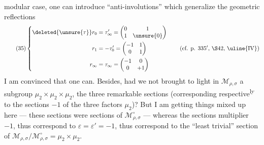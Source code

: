 modular case, one can introduce ``anti-involutions'' which generalize the geometric reflections
\[
\tag{35}
\left\{
\begin{aligned}
\deleted{\unsure{\tau}}r_0&=\tau'_\infty=\begin{pmatrix}0&1\\1&\unsure{0}\end{pmatrix}\\
r_1&=-\tau'_0=\begin{pmatrix}-1&1\\0&1\end{pmatrix}\\
r_\infty&=\tau_\infty=\begin{pmatrix}-1&0\\0&+1\end{pmatrix}
\end{aligned}
\right.
\qquad\text{(cf. p. $335'$, $\S42$, $\uline{\mathrm{IV}}$)}
\]
I am convinced that one can. Besides, had we not brought to light in $\mathcal M_{\rho,\sigma}$ a subgroup $\mu_2\times\mu_2\times\mu_2$,   the three remarkable sections (corresponding respective\textsuperscript{ly} to the  sections $-1$ of the three factors $\mu_2$)? But I am getting things mixed up here --- these sections were sections of $\mathcal M_{\rho,\sigma}^{\circ}$ --- whereas the sections    multiplier
$-1$, thus correspond to $\varepsilon=\varepsilon'=-1$, thus correspond to the ``least trivial'' section  of $\mathcal M_{\rho,\sigma}/\mathcal M_{\rho,\sigma}^{\circ}=\mu_2\times\mu_2$.

